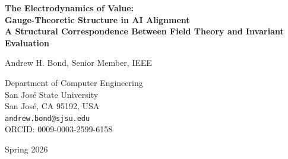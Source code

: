 \documentclass[12pt]{article}
\begin{document}
\begin{titlepage}
\centering
\vspace*{2cm}

{\LARGE\bfseries The Electrodynamics of Value:\\Gauge-Theoretic Structure in AI Alignment\\[0.5em]
\large A Structural Correspondence Between Field Theory and Invariant Evaluation}

\vspace{1.5cm}

{\Large Andrew H. Bond, Senior Member, IEEE}

\vspace{0.5cm}

{\large
Department of Computer Engineering\\
San Jos\'e State University\\
San Jos\'e, CA 95192, USA\\[0.3cm]
\texttt{andrew.bond@sjsu.edu}\\[0.3cm]
ORCID: 0009-0003-2599-6158
}

\vspace{1cm}

{\large Spring 2026}

\vspace{2cm}


\end{titlepage}
\end{document}
